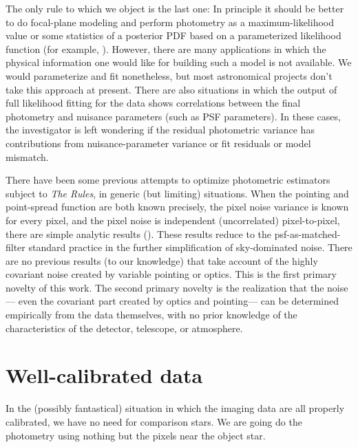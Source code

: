 \documentclass[12pt, letterpaper, preprint]{aastex}
\begin{document}
The only rule to which we object is the last one:
In principle it should be better to do focal-plane modeling
  and perform photometry as a maximum-likelihood value
  or some statistics of a posterior PDF
  based on a parameterized likelihood function (for example, \citealt{hoggwhitepaper}).
However, there are many applications in which
  the physical information one would like for building such a model is not available.
We would parameterize and fit nonetheless,
  but most astronomical projects don't take this approach at present.
There are also situations in which the output of full likelihood fitting for the data
  shows correlations between the final photometry and nuisance parameters (such as PSF parameters).
In these cases, the investigator is left wondering if the residual photometric variance
  has contributions from nuisance-parameter variance or fit residuals or model mismatch.

There have been some previous attempts to optimize photometric estimators subject to \emph{The Rules},
  in generic (but limiting) situations.
When the pointing and point-spread function are both known precisely,
  the pixel noise variance is known for every pixel,
  and the pixel noise is independent (uncorrelated) pixel-to-pixel,
  there are simple analytic results (\citealt{naylor}).
These results reduce to the psf-as-matched-filter standard practice
  in the further simplification of sky-dominated noise.
There are no previous results (to our knowledge) that take account of
  the highly covariant noise created by variable pointing or optics.
This is the first primary novelty of this work.
The second primary novelty is the realization that the noise---%
  even the covariant part created by optics and pointing---%
  can be determined empirically from the data themselves,
  with no prior knowledge of the characteristics of the detector,
  telescope, or atmosphere.

\section{Well-calibrated data}

In the (possibly fantastical) situation in which the imaging data are all properly calibrated,
  we have no need for comparison stars.
We are going do the photometry using nothing but the pixels near the object star.
\end{document}
